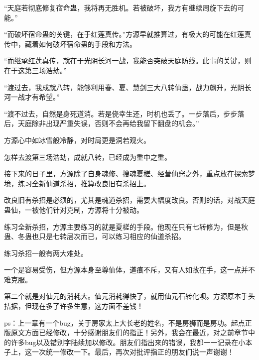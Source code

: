 \begin{this_body}
“天庭若彻底修复宿命蛊，我将再无胜机。若被破坏，我方有继续周旋下去的可能。”

“而破坏宿命蛊的关键，在于红莲真传。”方源早就推算过，有极大的可能在红莲真传中，藏着如何破坏宿命蛊的手段和方法。

“而继承红莲真传，就在于光阴长河一战，我能否突破天庭防线。此事的关键，则在于这第三场浩劫。”

“渡过去，我成就八转，能够利用春、夏、慧剑三大八转仙蛊，战力飙升，光阴长河一战才有希望。”

“渡不过去，自然是身死道消。若是侥幸生还，时机也丢了。一步落后，步步落后，天庭除非出现严重失误，否则不会再给我留下翻盘的机会。”

方源心中如冰雪般冷静，对时局更是洞若观火。

怎样去渡第三场浩劫，成就八转，已经成为重中之重。

接下来的日子里，方源除了自身魂修、搜魂夏槎、经营仙窍之外，重点放在探索梦境，练习全新仙道杀招，推算改良旧有杀招上。

改良旧有杀招是必须的，尤其是魂道杀招，需要大幅度改良。否则的话，对战天庭蛊仙，一被他们针对克制，方源将十分被动。

练习全新杀招，方源主要练习的就是夏槎的手段。他现在只有七转修为，但是秋蛊、冬蛊也只是七转层次而已，可以练习相应的仙道杀招。

练习杀招一般有两大难处。

一个是容易受伤，但方源本身至尊仙体，道痕不斥，又有人如故在手，这一点并不难克服。

第二个就是对仙元的消耗大。仙元消耗得快了，就用仙元石转化呗。方源原本手头拮据，但现在多了许多生意，这方面不差钱！

ps：上一章有一个bug，关于房家太上大长老的姓名，不是房狮而是房功。起点正版原文方面已经修改，十分感谢朋友们的指正！另外，我会在最近，对之前章节中的许多bug以及错别字陆续加以修改。朋友们指出来的错误，我都一一记录在小本子上，这一次统一修改一下。最后，再次对批评指正的朋友们说一声谢谢！

\end{this_body}

